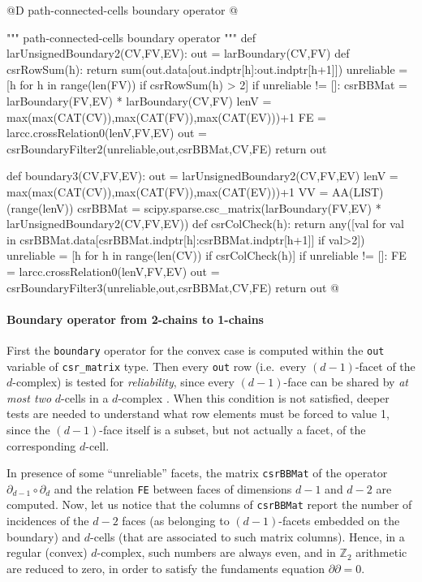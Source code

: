 \documentclass[11pt,oneside]{article}    %
\def\Z{\mathbb{Z}}
\begin{document}
@D path-connected-cells boundary operator
@{""" path-connected-cells boundary operator """
def larUnsignedBoundary2(CV,FV,EV):
    out = larBoundary(CV,FV)
    def csrRowSum(h): 
        return sum(out.data[out.indptr[h]:out.indptr[h+1]])    
    unreliable = [h for h in range(len(FV)) if csrRowSum(h) > 2]
    if unreliable != []:
        csrBBMat = larBoundary(FV,EV) * larBoundary(CV,FV)
        lenV = max(max(CAT(CV)),max(CAT(FV)),max(CAT(EV)))+1
        FE = larcc.crossRelation0(lenV,FV,EV)
        out = csrBoundaryFilter2(unreliable,out,csrBBMat,CV,FE)
    return out

def boundary3(CV,FV,EV):
    out = larUnsignedBoundary2(CV,FV,EV)
    lenV = max(max(CAT(CV)),max(CAT(FV)),max(CAT(EV)))+1
    VV = AA(LIST)(range(lenV))
    csrBBMat = scipy.sparse.csc_matrix(larBoundary(FV,EV) * larUnsignedBoundary2(CV,FV,EV))
    def csrColCheck(h): 
        return any([val for val in csrBBMat.data[csrBBMat.indptr[h]:csrBBMat.indptr[h+1]] if val>2])    
    unreliable = [h for h in range(len(CV)) if csrColCheck(h)]
    if unreliable != []:
        FE = larcc.crossRelation0(lenV,FV,EV)
        out = csrBoundaryFilter3(unreliable,out,csrBBMat,CV,FE)
    return out
@}

\paragraph{Boundary operator from 2-chains to 1-chains}

First the \texttt{boundary} operator for the convex case is computed within the \texttt{out} variable of \texttt{csr\_matrix} type. Then every \texttt{out} row (i.e.~every $(d-1)$-facet of the $d$-complex) is tested for \emph{reliability}, since every $(d-1)$-face can be shared by \emph{at most two} $d$-cells in a $d$-complex . When this condition is not satisfied, deeper tests are needed to understand what row elements must be forced to value 1, since the $(d-1)$-face itself is a subset, but not actually a facet, of the corresponding $d$-cell. 

In presence of some ``unreliable'' facets, the matrix \texttt{csrBBMat} of the operator $\partial_{d-1}\circ\partial_d$ and the relation \texttt{FE} between faces of dimensions $d-1$ and $d-2$ are computed. Now, let us notice that the columns of \texttt{csrBBMat} report the number of incidences of the $d-2$ faces (as belonging to $(d-1)$-facets embedded on the boundary) and $d$-cells (that are associated to such matrix columns). Hence, in a regular (convex) $d$-complex, such numbers are always even, and in $\Z_2$ arithmetic are reduced to zero, in order to satisfy the fundaments equation $\partial\partial=0$. 
\end{document}
